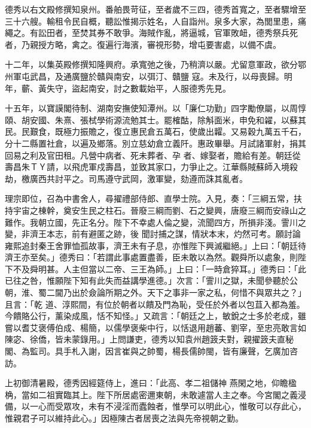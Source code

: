 \begin{pinyinscope}
 德秀以右文殿修撰知泉州。番舶畏苛征，至者歲不三四，德秀首寬之，至者驟增至三十六艘。輸租令民自概，聽訟惟揭示姓名，人自詣州。泉多大家，為閭里患，痛繩之。有訟田者，至焚其券不敢爭。海賊作亂，將逼城，官軍敗衄，德秀祭兵死者，乃親授方略，禽之。復遍行海濱，審視形勢，增屯要害處，以備不虞。



 十二年，以集英殿修撰知隆興府。承寬弛之後，乃稍濟以嚴。尤留意軍政，欲分鄂州軍屯武昌，及通廣鹽於贛與南安，以弭汀、贛鹽
 寇。未及行，以母喪歸。明年，蘄、黃失守，盜起南安，討之數載始平，人服德秀先見。



 十五年，以寶謨閣待制、湖南安撫使知潭州。以「廉仁功勤」四字勵僚屬，以周惇頤、胡安國、朱熹、張栻學術源流勉其士。罷榷酤，除斛面米，申免和糴，以蘇其民。民艱食，既極力振贍之，復立惠民倉五萬石，使歲出糶。又易穀九萬五千石，分十二縣置社倉，以遍及鄉落。別立慈幼倉立義阡。惠政畢舉。月試諸軍射，捐其回易之利及官田租。凡營中病者、死未葬者、孕
 者、嫁娶者，贍給有差。朝廷從壽昌朱ＴＹ請，以飛虎軍戍壽昌，並致其家口，力爭止之。江華縣賊蘇師入境殺劫，檄廣西共討平之。司馬遵守武岡，激軍變，劾遵而誅其亂者。



 理宗即位，召為中書舍人，尋擢禮部侍郎、直學士院。入見，奏：「三綱五常，扶持宇宙之棟幹，奠安生民之柱石。晉廢三綱而劉、石之變興，唐廢三綱而安祿山之難作。我朝立國，先正名分。陛下不幸處人倫之變，流聞四方，所損非淺。霅川之變，非濟王本志，前有避匿之跡，後
 聞討捕之謀，情狀本末，灼然可考。願討論雍熙追封秦王舍罪恤孤故事，濟王未有子息，亦惟陛下興滅繼絕。」上曰：「朝廷待濟王亦至矣。」德秀曰：「若謂此事處置盡善，臣未敢以為然。觀舜所以處象，則陛下不及舜明甚。人主但當以二帝、三王為師。」上曰：「一時倉猝耳。」德秀曰：「此已往之咎，惟願陛下知有此失而益講學進德。」次言：「霅川之獄，未聞參聽於公朝，淮、蜀二閫乃出於僉論所期之外。天下之事非一家之私，何惜不與眾共之？」且言：「乾
 道、淳熙間，有位於朝者以饋及門為恥，受任於外者以包苴入都為羞。今饋賂公行，薰染成風，恬不知怪。」又疏言：「朝廷之上，敏銳之士多於老成，雖嘗以耆艾褒傅伯成、楊簡，以儒學褒柴中行，以恬退用趙蕃、劉宰，至忠亮敢言如陳宓、徐僑，皆未蒙錄用。」上問謙吏，德秀以知袁州趙䈣夫對，親擢䈣夫直秘閣、為監司。具手札入謝，因言崔與之帥蜀，楊長儒帥閩，皆有廉聲，乞廣加咨訪。



 上初御清暑殿，德秀因經筵侍上，進曰：「此高、孝二祖儲神
 燕閑之地，仰瞻楹桷，當如二祖實臨其上。陛下所居處密邇東朝，未敢遽當人主之奉。今宮閣之義浸備，以一心而受眾攻，未有不浸淫而蠹蝕者，惟學可以明此心，惟敬可以存此心，惟親君子可以維持此心。」因極陳古者居喪之法與先帝視朝之勤。




\end{pinyinscope}
